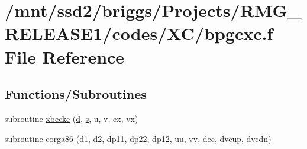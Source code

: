\hypertarget{bpgcxc_8f}{\section{/mnt/ssd2/briggs/\-Projects/\-R\-M\-G\-\_\-\-R\-E\-L\-E\-A\-S\-E1/codes/\-X\-C/bpgcxc.f File Reference}
\label{bpgcxc_8f}
}
\subsection*{Functions/\-Subroutines}
\begin{DoxyCompactItemize}
\item 
subroutine \hyperlink{bpgcxc_8f_a9a67fabe57cb7094d92f01a342b1d7e4}{xbecke} (\hyperlink{gga__xc__th_8c_a71729f52320926b2723634a38936f249}{d}, \hyperlink{_t_d_d_f_t_2_common_2init__wf__gaussian_8c_ac9562ee4ecb3b8aeebeb04656e7e57a9}{s}, u, v, ex, vx)
\item 
subroutine \hyperlink{bpgcxc_8f_a087e77e1018b5a29bd9fefbf9804d777}{corga86} (d1, d2, dp11, dp22, dp12, uu, vv, dec, dvcup, dvcdn)
\end{DoxyCompactItemize}


